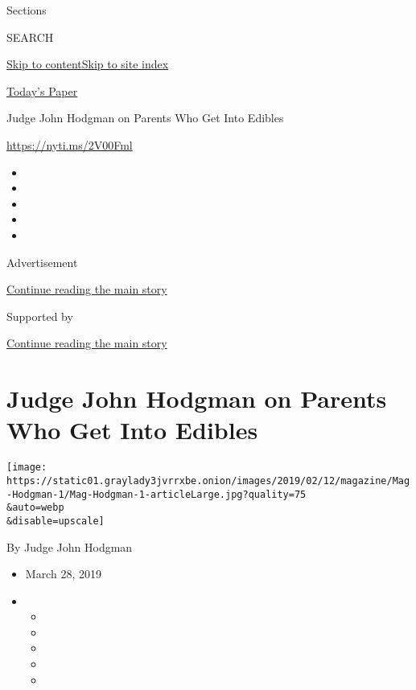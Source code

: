 Sections

SEARCH

\protect\hyperlink{site-content}{Skip to
content}\protect\hyperlink{site-index}{Skip to site index}

\href{https://myaccount.nytimes3xbfgragh.onion/auth/login?response_type=cookie\&client_id=vi}{}

\href{https://www.nytimes3xbfgragh.onion/section/todayspaper}{Today's
Paper}

Judge John Hodgman on Parents Who Get Into Edibles

\url{https://nyti.ms/2V00Fml}

\begin{itemize}
\item
\item
\item
\item
\item
\end{itemize}

Advertisement

\protect\hyperlink{after-top}{Continue reading the main story}

Supported by

\protect\hyperlink{after-sponsor}{Continue reading the main story}

\hypertarget{judge-john-hodgman-on-parents-who-get-into-edibles}{%
\section{Judge John Hodgman on Parents Who Get Into
Edibles}\label{judge-john-hodgman-on-parents-who-get-into-edibles}}

\texttt{[image: https://static01.graylady3jvrrxbe.onion/images/2019/02/12/magazine/Mag-Hodgman-1/Mag-Hodgman-1-articleLarge.jpg?quality=75\\\&auto=webp\\\&disable=upscale]}

By Judge John Hodgman

\begin{itemize}
\item
  March 28, 2019
\item
  \begin{itemize}
  \item
  \item
  \item
  \item
  \item
  \end{itemize}
\end{itemize}

